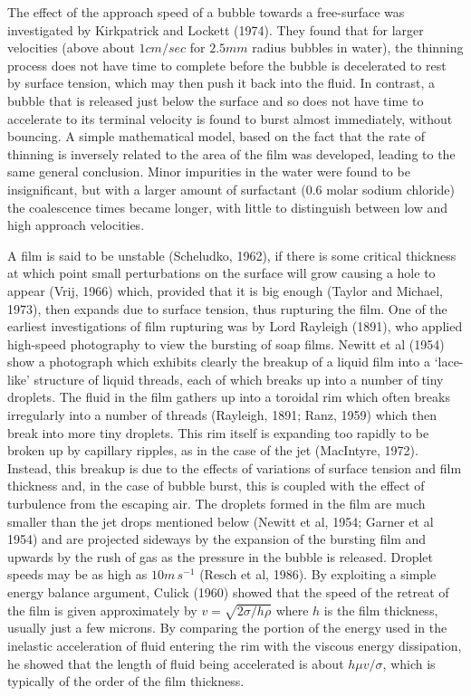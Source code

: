 The effect of the approach speed of a bubble
towards a free-surface was investigated by Kirkpatrick and Lockett (1974).
They found that for larger velocities (above about $1cm/sec$
for $2.5mm$ radius bubbles in water),
the thinning process
does not have time to complete before the bubble is decelerated to
rest by surface tension, which may then push it back into the 
fluid. In contrast, a bubble that is released just below the surface
and so does not have time to accelerate to its terminal velocity
is found to burst almost immediately, without bouncing. A simple mathematical 
model, based on the fact that the rate of thinning 
is inversely related to the area of the film was developed, 
leading to the same general conclusion. Minor impurities in the water
were found to be insignificant, but with a larger amount of surfactant
($0.6$ molar sodium chloride)
the coalescence times became longer, with
little to distinguish between low and high approach velocities.

A film is said to be
unstable (Scheludko, 1962), if there is some critical thickness at which point
small perturbations on the surface will
grow causing a hole to appear (Vrij, 1966) which,
provided that it is big enough (Taylor and Michael, 1973), then expands due to
surface tension, thus rupturing the film. 
One of the earliest investigations of film rupturing was by 
Lord Rayleigh (1891), who applied high-speed photography to 
view the bursting of soap films. Newitt et al (1954) show a 
photograph which exhibits clearly the breakup of a liquid film
into a `lace-like' structure of liquid threads, each of which breaks
up into a number of tiny droplets. 
The fluid in the film gathers up into a toroidal rim which 
often breaks irregularly into a number of threads (Rayleigh, 1891;
Ranz, 1959) which then break into more tiny droplets. 
This rim itself is expanding too rapidly to
be broken up by capillary ripples, as in the case of the jet (MacIntyre, 1972).
Instead,
this breakup is due to the effects of variations of surface tension and film 
thickness and, in the case of bubble burst, this is coupled with the 
effect of turbulence from the escaping air.
The droplets formed in the film are much smaller than the
jet drops mentioned below (Newitt et al, 1954; Garner et al 1954) and
are projected sideways by the expansion of the bursting film and upwards
by the rush of gas as the pressure in the bubble is released.
Droplet speeds may be as high as $10m\,s^{-1}$ (Resch et al, 1986).
By exploiting a simple
energy balance argument, Culick (1960) showed that the speed 
of the retreat of the film is given approximately by 
$v=\sqrt{2\sigma/h\rho}$ where $h$ is the film thickness,
usually just a few microns.
By comparing the portion of the energy used in the inelastic 
acceleration of fluid entering the rim with the viscous energy dissipation,
he showed that the length of fluid being
accelerated is about $h\mu v/\sigma$, which is typically of the 
order of the film thickness.

